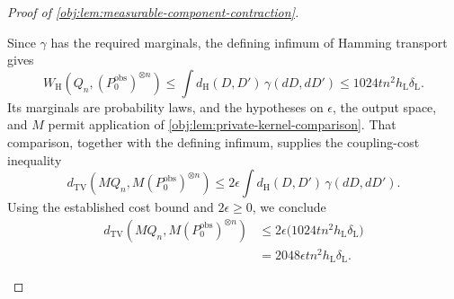 \begin{proof}[Proof of \cref{obj:lem:measurable-component-contraction}]
\begin{enumerate}
Since \(\gamma\) has the required marginals, the defining infimum of Hamming transport gives
\[
W_{\mathrm H}\!\left(Q_n,(P_0^{\mathrm{obs}})^{\otimes n}\right)
\le
\int d_{\mathrm H}(D,D')\,\gamma(dD,dD')
\le1024tn^2h_{\mathrm L}\delta_{\mathrm L}.
\]
Its marginals are probability laws, and the hypotheses on \(\epsilon\), the output space, and \(M\) permit application of
\cref{obj:lem:private-kernel-comparison}. That comparison, together with the defining infimum, supplies the coupling-cost inequality
\[
d_{\mathrm{TV}}\!\left(MQ_n,M(P_0^{\mathrm{obs}})^{\otimes n}\right)
\le
2\epsilon
\int d_{\mathrm H}(D,D')\,\gamma(dD,dD').
\]
Using the established cost bound and \(2\epsilon\ge0\), we conclude
\[
\begin{aligned}
d_{\mathrm{TV}}\!\left(MQ_n,M(P_0^{\mathrm{obs}})^{\otimes n}\right)
&\le
2\epsilon\bigl(1024tn^2h_{\mathrm L}\delta_{\mathrm L}\bigr)\\
&=
2048\epsilon tn^2h_{\mathrm L}\delta_{\mathrm L}.
\end{aligned}
\]
\end{enumerate}
\end{proof}
